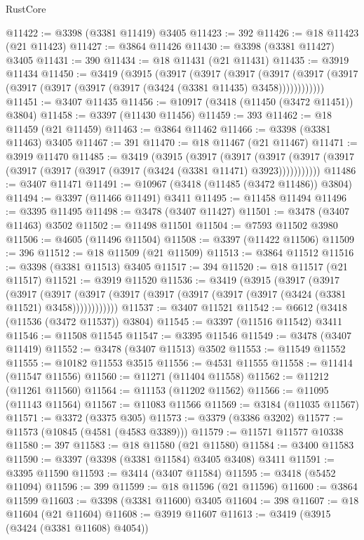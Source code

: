 \begin{lexlean}{RustCore}
\begin{coremodule}
@11422 := @3398 (@3381 @11419) @3405
@11423 := 392
@11426 := @18 @11423 (@21 @11423)
@11427 := @3864 @11426
@11430 := @3398 (@3381 @11427) @3405
@11431 := 390
@11434 := @18 @11431 (@21 @11431)
@11435 := @3919 @11434
@11450 := @3419
    (@3915
      (@3917
        (@3917
          (@3917
            (@3917 (@3917 (@3917 (@3917 (@3917 (@3917 (@3917 (@3424 (@3381 @11435) @3458))))))))))))
@11451 := @3407 @11435
@11456 := @10917 (@3418 (@11450 (@3472 @11451)) @3804)
@11458 := @3397 (@11430 @11456)
@11459 := 393
@11462 := @18 @11459 (@21 @11459)
@11463 := @3864 @11462
@11466 := @3398 (@3381 @11463) @3405
@11467 := 391
@11470 := @18 @11467 (@21 @11467)
@11471 := @3919 @11470
@11485 := @3419
    (@3915
      (@3917
        (@3917
          (@3917 (@3917 (@3917 (@3917 (@3917 (@3917 (@3917 (@3424 (@3381 @11471) @3923)))))))))))
@11486 := @3407 @11471
@11491 := @10967 (@3418 (@11485 (@3472 @11486)) @3804)
@11494 := @3397 (@11466 @11491) @3411
@11495 := @11458 @11494
@11496 := @3395 @11495
@11498 := @3478 (@3407 @11427)
@11501 := @3478 (@3407 @11463) @3502
@11502 := @11498 @11501
@11504 := @7593 @11502 @3980
@11506 := @4605 (@11496 @11504)
@11508 := @3397 (@11422 @11506)
@11509 := 396
@11512 := @18 @11509 (@21 @11509)
@11513 := @3864 @11512
@11516 := @3398 (@3381 @11513) @3405
@11517 := 394
@11520 := @18 @11517 (@21 @11517)
@11521 := @3919 @11520
@11536 := @3419
    (@3915
      (@3917
        (@3917
          (@3917
            (@3917 (@3917 (@3917 (@3917 (@3917 (@3917 (@3917 (@3424 (@3381 @11521) @3458))))))))))))
@11537 := @3407 @11521
@11542 := @6612 (@3418 (@11536 (@3472 @11537)) @3804)
@11545 := @3397 (@11516 @11542) @3411
@11546 := @11508 @11545
@11547 := @3395 @11546
@11549 := @3478 (@3407 @11419)
@11552 := @3478 (@3407 @11513) @3502
@11553 := @11549 @11552
@11555 := @10182 @11553 @3515
@11556 := @4531 @11555
@11558 := @11414 (@11547 @11556)
@11560 := @11271 (@11404 @11558)
@11562 := @11212 (@11261 @11560)
@11564 := @11153 (@11202 @11562)
@11566 := @11095 (@11143 @11564)
@11567 := @11083 @11566
@11569 := @3184 (@11035 @11567)
@11571 := @3372 (@3375 @305)
@11573 := @3379 (@3386 @3202)
@11577 := @11573 (@10845 (@4581 (@4583 @3389)))
@11579 := @11571 @11577 @10338
@11580 := 397
@11583 := @18 @11580 (@21 @11580)
@11584 := @3400 @11583
@11590 := @3397 (@3398 (@3381 @11584) @3405 @3408) @3411
@11591 := @3395 @11590
@11593 := @3414 (@3407 @11584)
@11595 := @3418 (@5452 @11094)
@11596 := 399
@11599 := @18 @11596 (@21 @11596)
@11600 := @3864 @11599
@11603 := @3398 (@3381 @11600) @3405
@11604 := 398
@11607 := @18 @11604 (@21 @11604)
@11608 := @3919 @11607
@11613 := @3419 (@3915 (@3424 (@3381 @11608) @4054))

\end{coremodule}
\end{lexlean}
